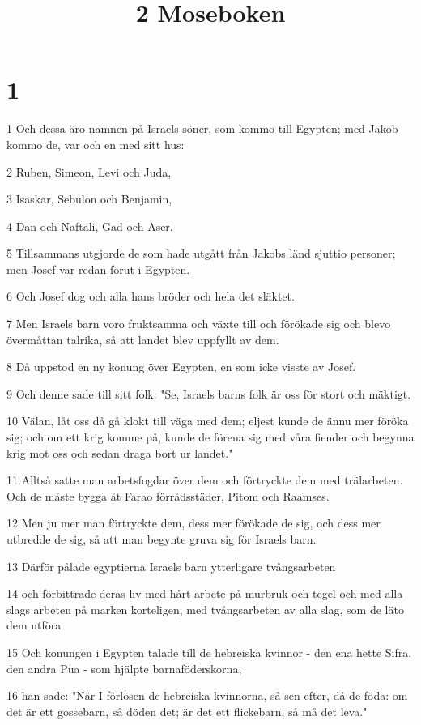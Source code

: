 

\title{2 Moseboken}


\chapter{1}

\par 1 Och dessa äro namnen på Israels söner, som kommo till Egypten; med Jakob kommo de, var och en med sitt hus:
\par 2 Ruben, Simeon, Levi och Juda,
\par 3 Isaskar, Sebulon och Benjamin,
\par 4 Dan och Naftali, Gad och Aser.
\par 5 Tillsammans utgjorde de som hade utgått från Jakobs länd sjuttio personer; men Josef var redan förut i Egypten.
\par 6 Och Josef dog och alla hans bröder och hela det släktet.
\par 7 Men Israels barn voro fruktsamma och växte till och förökade sig och blevo övermåttan talrika, så att landet blev uppfyllt av dem.
\par 8 Då uppstod en ny konung över Egypten, en som icke visste av Josef.
\par 9 Och denne sade till sitt folk: "Se, Israels barns folk är oss för stort och mäktigt.
\par 10 Välan, låt oss då gå klokt till väga med dem; eljest kunde de ännu mer föröka sig; och om ett krig komme på, kunde de förena sig med våra fiender och begynna krig mot oss och sedan draga bort ur landet."
\par 11 Alltså satte man arbetsfogdar över dem och förtryckte dem med trälarbeten. Och de måste bygga åt Farao förrådsstäder, Pitom och Raamses.
\par 12 Men ju mer man förtryckte dem, dess mer förökade de sig, och dess mer utbredde de sig, så att man begynte gruva sig för Israels barn.
\par 13 Därför pålade egyptierna Israels barn ytterligare tvångsarbeten
\par 14 och förbittrade deras liv med hårt arbete på murbruk och tegel och med alla slags arbeten på marken korteligen, med tvångsarbeten av alla slag, som de läto dem utföra
\par 15 Och konungen i Egypten talade till de hebreiska kvinnor - den ena hette Sifra, den andra Pua - som hjälpte barnaföderskorna,
\par 16 han sade: "När I förlösen de hebreiska kvinnorna, så sen efter, då de föda: om det är ett gossebarn, så döden det; är det ett flickebarn, så må det leva."
